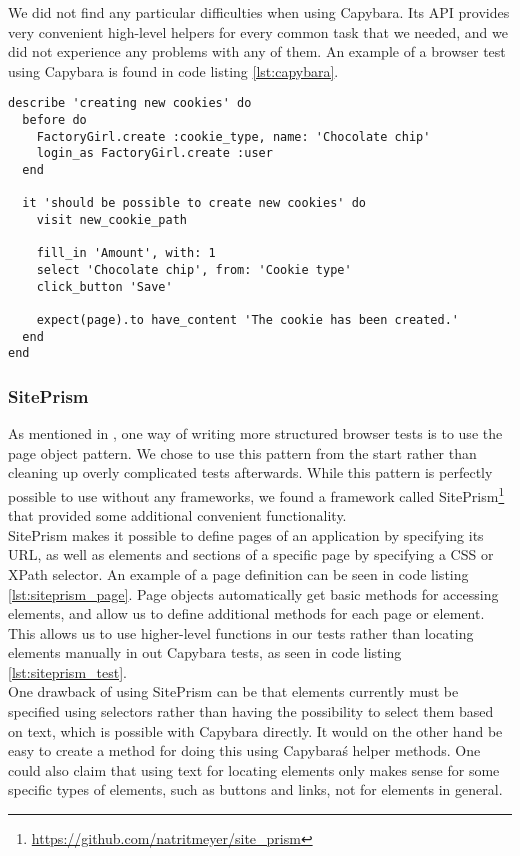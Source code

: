 We did not find any particular difficulties when using Capybara. Its API
provides very convenient high-level helpers for every common task that
we needed, and we did not experience any problems with any of them. An
example of a browser test using Capybara is found in code listing
\ref{lst:capybara}.\\


\begin{lstlisting}[caption=A browser test written in RSpec using Capybara.,
                   label=lst:capybara, float=t]
describe 'creating new cookies' do
  before do
    FactoryGirl.create :cookie_type, name: 'Chocolate chip'
    login_as FactoryGirl.create :user
  end

  it 'should be possible to create new cookies' do
    visit new_cookie_path

    fill_in 'Amount', with: 1
    select 'Chocolate chip', from: 'Cookie type'
    click_button 'Save'

    expect(page).to have_content 'The cookie has been created.'
  end
end
\end{lstlisting}


\subsubsection{SitePrism}

As mentioned in , one way of writing more
structured browser tests is to use the page object pattern. We chose to
use this pattern from the start rather than cleaning up overly
complicated tests afterwards. While this pattern is perfectly possible
to use without any frameworks, we found a framework called
SitePrism\footnote{\url{https://github.com/natritmeyer/site_prism}}
that provided some additional convenient functionality.\\

SitePrism makes it possible to define pages of an application by
specifying its URL, as well as elements and sections of a specific page
by specifying a CSS or XPath selector. An example of a page
definition can be seen in code listing \ref{lst:siteprism_page}. Page
objects automatically get basic methods for accessing elements, and
allow us to define additional methods for each page or element. This
allows us to use higher-level functions in our tests rather than
locating elements manually in out Capybara tests, as seen in code
listing \ref{lst:siteprism_test}.\\

One drawback of using SitePrism can be that elements currently must be
specified using selectors rather than having the possibility to select
them based on text, which is possible with Capybara directly. It would
on the other hand be easy to create a method for doing this using
Capybara\'s helper methods. One could also claim that using text for
locating elements only makes sense for some specific types of elements,
such as buttons and links, not for elements in general.\\

